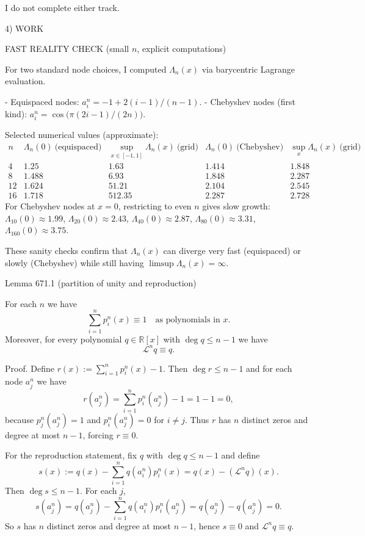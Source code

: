 I do not complete either track.

4) WORK

FAST REALITY CHECK (small $n$, explicit computations)

For two standard node choices, I computed $\Lambda_n(x)$ via barycentric Lagrange evaluation.

- Equispaced nodes: $a_i^n=-1+2(i-1)/(n-1)$.
- Chebyshev nodes (first kind): $a_i^n=\cos\bigl(\pi(2i-1)/(2n)\bigr)$.

Selected numerical values (approximate):
\[
\begin{array}{c|cc|cc}
 n & \Lambda_n(0)\ \text{(equispaced)} & \sup_{x\in[-1,1]}\Lambda_n(x)\ \text{(grid)} & \Lambda_n(0)\ \text{(Chebyshev)} & \sup_x\Lambda_n(x)\ \text{(grid)}\\\hline
 4 & 1.25 & 1.63 & 1.414 & 1.848\\
 8 & 1.488 & 6.93 & 1.848 & 2.287\\
 12 & 1.624 & 51.21 & 2.104 & 2.545\\
 16 & 1.718 & 512.35 & 2.287 & 2.728
\end{array}
\]
For Chebyshev nodes at $x=0$, restricting to even $n$ gives slow growth: $\Lambda_{10}(0)\approx1.99$, $\Lambda_{20}(0)\approx2.43$, $\Lambda_{40}(0)\approx2.87$, $\Lambda_{80}(0)\approx3.31$, $\Lambda_{160}(0)\approx3.75$.

These sanity checks confirm that $\Lambda_n(x)$ can diverge very fast (equispaced) or slowly (Chebyshev) while still having $\limsup\Lambda_n(x)=\infty$.

Lemma 671.1 (partition of unity and reproduction)

For each $n$ we have
\[
 \sum_{i=1}^n p_i^n(x)\equiv 1\quad\text{as polynomials in }x.
\]
Moreover, for every polynomial $q\in\mathbb R[x]$ with $\deg q\le n-1$ we have
\[
 \mathcal L^n q\equiv q.
\]

Proof.
Define $r(x):=\sum_{i=1}^n p_i^n(x)-1$. Then $\deg r\le n-1$ and for each node $a_j^n$ we have
\[
 r(a_j^n)=\sum_{i=1}^n p_i^n(a_j^n)-1 = 1-1=0,
\]
because $p_j^n(a_j^n)=1$ and $p_i^n(a_j^n)=0$ for $i\ne j$. Thus $r$ has $n$ distinct zeros and degree at most $n-1$, forcing $r\equiv 0$.

For the reproduction statement, fix $q$ with $\deg q\le n-1$ and define
\[
 s(x):=q(x)-\sum_{i=1}^n q(a_i^n)p_i^n(x)=q(x)-(\mathcal L^n q)(x).
\]
Then $\deg s\le n-1$. For each $j$,
\[
 s(a_j^n)=q(a_j^n)-\sum_{i=1}^n q(a_i^n)p_i^n(a_j^n)=q(a_j^n)-q(a_j^n)=0.
\]
So $s$ has $n$ distinct zeros and degree at most $n-1$, hence $s\equiv 0$ and $\mathcal L^n q\equiv q$.


